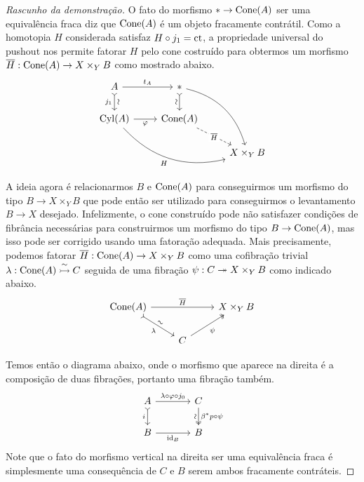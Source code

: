 \begin{proof}[Rascunho da demonstração]
  O fato do morfismo $* \to \mathrm{Cone}(A)$ ser uma equivalência fraca diz que $\mathrm{Cone}(A)$ é um objeto fracamente contrátil.
  Como a homotopia $H$ considerada satisfaz $H \circ j_{1} = \mathrm{ct}$, a propriedade universal do pushout nos permite fatorar $H$ pelo cone costruído para obtermos um morfismo $\overline{H}: \mathrm{Cone}(A) \to X \times_{Y} B$ como mostrado abaixo.
  \begin{displaymath}
     \begin{tikzcd}
      A
      \arrow[r, "t_{A}"]
      \arrow[d, tail, "j_{1}" {swap}, "\sim" {sloped}]
      & *
      \arrow[d, tail, "\sim" {swap,sloped}]
      \arrow[rdd, bend left=30]
      \\ \Cyl(A)
      \arrow[r, "\varphi" swap]
      \arrow[rrd, bend right=30, "H" swap]
      & \Cone(A)
      \arrow[rd, dashed, "\overline{H}" description]
      \\ & & X \times_{Y} B
    \end{tikzcd}
  \end{displaymath}

  A ideia agora é relacionarmos $B$ e $\mathrm{Cone}(A)$ para conseguirmos um morfismo do tipo $B \to X \times_{Y} B$ que pode então ser utilizado para conseguirmos o levantamento $B \to X$ desejado.
  Infelizmente, o cone construído pode não satisfazer condições de fibrância necessárias para construirmos um morfismo do tipo $B \to \mathrm{Cone}(A)$, mas isso pode ser corrigido usando uma fatoração adequada.
  Mais precisamente, podemos fatorar $\overline{H}: \mathrm{Cone}(A) \to X \times_{Y} B$ como uma cofibração trivial $\lambda: \mathrm{Cone}(A) \overset{\sim}{\rightarrowtail} C$ seguida de uma fibração $\psi: C \twoheadrightarrow X \times_{Y} B$ como indicado abaixo.
  \begin{displaymath}
    \begin{tikzcd}
      \Cone(A)
      \arrow[rr, "\overline{H}"]
      \arrow[rd, tail, "\sim" {sloped}, "\lambda" {swap}]
      & & X \times_{Y} B
      \\ & C
      \arrow[ru, two heads, "\psi" swap]
    \end{tikzcd}
  \end{displaymath}

  Temos então o diagrama abaixo, onde o morfismo que aparece na direita é a composição de duas fibrações, portanto uma fibração também.
  \begin{displaymath}
    \begin{tikzcd}[column sep=1.25cm]
      A
      \arrow[d, tail, "i" swap]
      \arrow[r, "\lambda \circ \varphi \circ j_{0}"]
      & C
      \arrow[d, two heads, "\beta^{*}p \circ \psi", "\sim" {swap,sloped}]
      \\ B
      \arrow[r, "\id_{B}" swap]
      & B
    \end{tikzcd}
  \end{displaymath}
  Note que o fato do morfismo vertical na direita ser uma equivalência fraca é simplesmente uma consequência de $C$ e $B$ serem ambos fracamente contráteis.


\end{proof}
